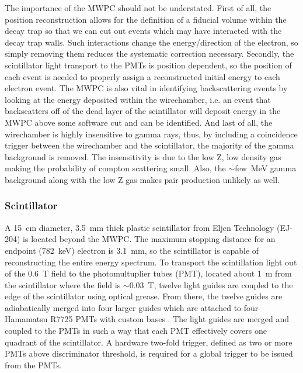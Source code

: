 The importance of the MWPC should not be understated. First of all, the position reconstruction allows for the
definition of a fiducial volume within the decay trap so that we can cut out events which may have interacted
with the decay trap walls. Such interactions change the energy/direction of the electron, so simply removing them
reduces the systematic correction necessary. Secondly, the scintillator light transport to the PMTs is position
dependent, so the position of each event is needed to properly assign a reconstructed initial energy to
each electron event. The MWPC is also vital in identifying backscattering events by looking at the energy
deposited within the wirechamber, i.e. an event that backscatters off of the dead layer of the scintillator
will deposit energy in the MWPC above some software cut and can be identified. And last of all,
the wirechamber is highly insensitive to gamma rays, thus, by including a coincidence trigger between the wirechamber
and the scintillator, the majority of the gamma background is removed. The insensitivity is due to
the low Z, low density gas making the probability of compton
scattering small. Also, the $\sim$few~MeV gamma background along with the low Z gas makes pair production
unlikely as well.

\subsubsection{Scintillator}

A 15~cm diameter, 3.5~mm thick plastic scintillator \cite{plaster2012}
from Eljen Technology (EJ-204) is located beyond the
MWPC. The maximum stopping distance for an endpoint (782~keV) electron is 3.1~mm, so the
scintillator is capable of reconstructing the entire energy spectrum. To transport the
scintillation light out of the 0.6~T field to the photomultuplier tubes (PMT),
located about 1~m from the scintillator where the field is $\sim0.03$~T,
twelve light guides are coupled to the edge of the scintillator using optical grease.
From there, the twelve guides are adiabatically merged into four
larger guides which are attached to four Hamamatsu R7725 PMTs with custom bases \cite{hickerson2013}.
The light guides are merged and coupled to the PMTs in such a way that each PMT effectively
covers one quadrant of the scintillator.
A hardware two-fold trigger, defined as two or more PMTs above discriminator threshold, is required for a
global trigger to be issued from the PMTs.

